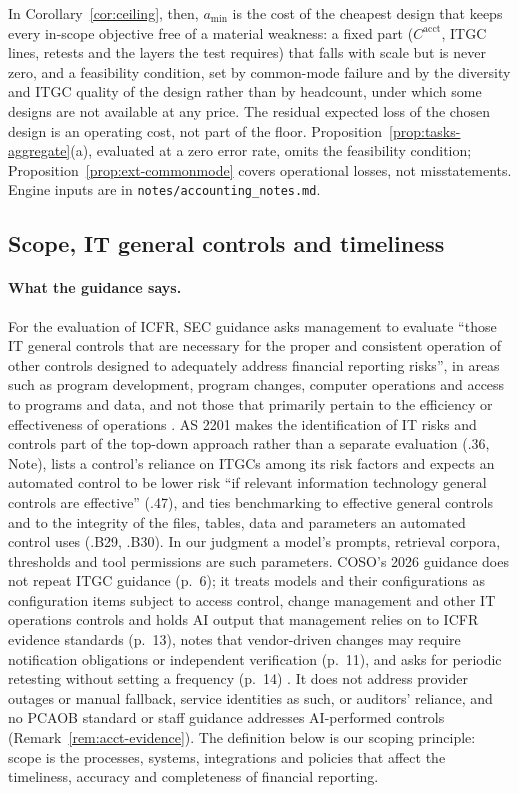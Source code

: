 In Corollary~\ref{cor:ceiling}, then, $a_{\min}$ is the cost of the cheapest design that keeps every in-scope objective free of a material weakness: a fixed part ($C^{\mathrm{acct}}$, ITGC lines, retests and the layers the test requires) that falls with scale but is never zero, and a feasibility condition, set by common-mode failure and by the diversity and ITGC quality of the design rather than by headcount, under which some designs are not available at any price. The residual expected loss of the chosen design is an operating cost, not part of the floor. Proposition~\ref{prop:tasks-aggregate}(a), evaluated at a zero error rate, omits the feasibility condition; Proposition~\ref{prop:ext-commonmode} covers operational losses, not misstatements. Engine inputs are in \texttt{notes/accounting\_notes.md}.

\subsection{Scope, IT general controls and timeliness}\label{sec:acct-scope}

\paragraph{What the guidance says.} For the evaluation of ICFR, SEC guidance asks management to evaluate ``those IT general controls that are necessary for the proper and consistent operation of other controls designed to adequately address financial reporting risks'', in areas such as program development, program changes, computer operations and access to programs and data, and not those that primarily pertain to the efficiency or effectiveness of operations \citep{sec2007guidance}. AS 2201 makes the identification of IT risks and controls part of the top-down approach rather than a separate evaluation (.36, Note), lists a control's reliance on ITGCs among its risk factors and expects an automated control to be lower risk ``if relevant information technology general controls are effective'' (.47), and ties benchmarking to effective general controls and to the integrity of the files, tables, data and parameters an automated control uses (.B29, .B30). In our judgment a model's prompts, retrieval corpora, thresholds and tool permissions are such parameters. COSO's 2026 guidance does not repeat ITGC guidance (p.~6); it treats models and their configurations as configuration items subject to access control, change management and other IT operations controls and holds AI output that management relies on to ICFR evidence standards (p.~13), notes that vendor-driven changes may require notification obligations or independent verification (p.~11), and asks for periodic retesting without setting a frequency (p.~14) \citep{coso2026genai}. It does not address provider outages or manual fallback, service identities as such, or auditors' reliance, and no PCAOB standard or staff guidance addresses AI-performed controls (Remark~\ref{rem:acct-evidence}). The definition below is our scoping principle: scope is the processes, systems, integrations and policies that affect the timeliness, accuracy and completeness of financial reporting.

